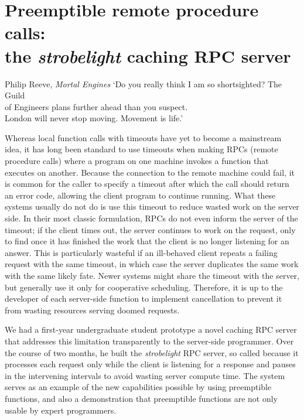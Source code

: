 \chapter{Preemptible remote procedure calls: \\ the \textit{strobelight} caching RPC server}
\label{chap:strobelight}

\ifdefined\chapquotes
\vspace{-1in}
\begin{chapquote}[1.5in]{Philip Reeve, \textit{Mortal Engines}}
`Do you really think I am so shortsighted?  The Guild \\
of Engineers plans further ahead than you suspect. \\
London will never stop moving.  Movement is life.'
\end{chapquote}
\fi

Whereas local function calls with timeouts have yet to become a mainstream idea, it
has long been standard to use timeouts when making RPCs (remote procedure calls)
where a program on one machine invokes a function that executes on another.  Because
the connection to the remote machine could fail, it is common for the caller to
specify a timeout after which the call should return an error code, allowing the
client program to continue running.  What these systems usually do not do is use this
timeout to reduce wasted work on the server side.  In their most classic formulation,
RPCs do not even inform the server of the timeout; if the client times out, the
server continues to work on the request, only to find once it has finished the work
that the client is no longer listening for an answer.  This is particularly wasteful
if an ill-behaved client repeats a failing request with the same timeout, in which
case the server duplicates the same work with the same likely fate.  Newer systems
might share the timeout with the server, but generally use it only for cooperative
scheduling.  Therefore, it is up to the developer of each server-side function to
implement cancellation to prevent it from wasting resources serving doomed requests.

We had a first-year undergraduate student prototype a novel caching RPC server that
addresses this limitation transparently to the server-side programmer.  Over the
course of two months, he built the \textit{strobelight} RPC server, so called because
it processes each request only while the client is listening for a response and
pauses in the intervening intervals to avoid wasting server compute time.  The system
serves as an example of the new capabilities possible by using preemptible functions,
and also a demonstration that preemptible functions are not only usable by expert
programmers.



